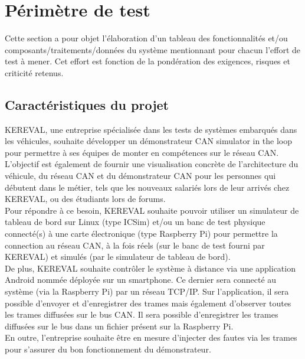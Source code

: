 
\section{Périmètre de test}
\label{sec:perimetre}
Cette section a pour objet l'élaboration d'un tableau des fonctionnalités et/ou composants/traitements/données du système mentionnant pour chacun l'effort de test à mener.
Cet effort est fonction de la pondération des exigences, risques et criticité retenus.

\subsection{Caractéristiques du projet}
\label{sec:peri:caract} 

KEREVAL, une entreprise spécialisée dans les tests de systèmes embarqués dans les véhicules, souhaite développer un démonstrateur CAN \og simulator in the loop \fg pour permettre à ses équipes de monter en compétences sur le réseau CAN.\\

L'objectif est également de fournir une visualisation concrète de l'architecture du véhicule, du réseau CAN et du démonstrateur CAN pour les personnes qui débutent dans le métier, tels que les nouveaux salariés lors de leur arrivés chez KEREVAL, ou des étudiants lors de forums.\\

Pour répondre à ce besoin, KEREVAL souhaite pouvoir utiliser un simulateur de tableau de bord sur Linux (type ICSim) et/ou un banc de test physique connecté(s) à une carte électronique (type Raspberry Pi) pour permettre la connection au réseau CAN, à la fois réels (sur le banc de test fourni par KEREVAL) et simulés (par le simulateur de tableau de bord).\\

De plus, KEREVAL souhaite contrôler le système à distance via une application Android nommée {\appliA} déployée sur un smartphone. Ce dernier sera connecté au système (via la Raspberry Pi) par un réseau TCP/IP. Sur l'application, il sera possible d'envoyer et d'enregistrer des trames mais également d'observer toutes les trames diffusées sur le bus CAN. Il sera possible d'enregistrer les trames diffusées sur le bus dans un fichier présent sur la Raspberry Pi.\\

En outre, l'entreprise souhaite être en mesure d'injecter des fautes via les trames pour s'assurer du bon fonctionnement du démonstrateur.\\

